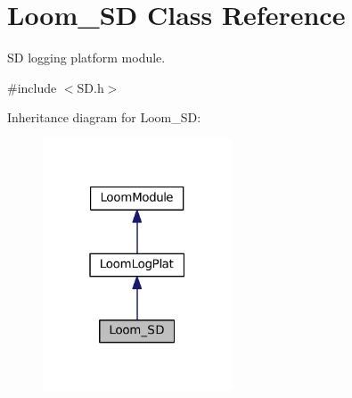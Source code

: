 \hypertarget{class_loom___s_d}{}\section{Loom\+\_\+\+SD Class Reference}
\label{class_loom___s_d}


SD logging platform module.  




{\ttfamily \#include $<$S\+D.\+h$>$}



Inheritance diagram for Loom\+\_\+\+SD\+:\nopagebreak
\begin{figure}[H]
\begin{center}
\leavevmode
\includegraphics[width=159pt]{class_loom___s_d__inherit__graph}
\end{center}
\end{figure}
